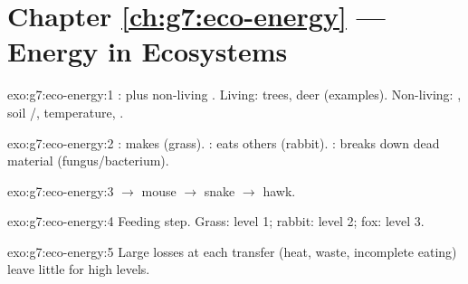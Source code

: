 \section*{Chapter \ref{ch:g7:eco-energy} --- Energy in Ecosystems}

\begin{solution}{exo:g7:eco-energy:1}
:  plus non-living . Living: trees, deer
(examples). Non-living: , soil /, temperature, .
\end{solution}

\begin{solution}{exo:g7:eco-energy:2}
: makes  (grass). : eats others (rabbit). :
breaks down dead material (fungus/bacterium).
\end{solution}

\begin{solution}{exo:g7:eco-energy:3}
 $\to$ mouse $\to$ snake $\to$ hawk.
\end{solution}

\begin{solution}{exo:g7:eco-energy:4}
Feeding step. Grass: level 1; rabbit: level 2; fox: level 3.
\end{solution}

\begin{solution}{exo:g7:eco-energy:5}
Large  losses at each transfer (heat, waste, incomplete eating) leave
little  for high levels.
\end{solution}

